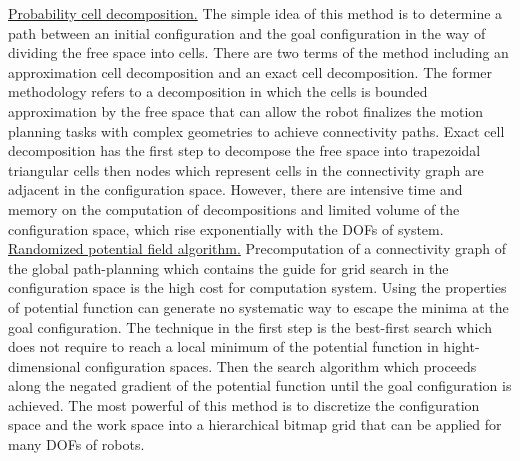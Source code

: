 \noindent\uline{Probability cell decomposition.} The simple idea of this method is to determine a path between an initial configuration and the goal configuration in the way of dividing the free space into cells. There are two terms of the method including an approximation cell decomposition and an exact cell decomposition\cite{Lingelbach04_PP_ProbabilisticCellDecomposition, Rosell05_PP_Harmonic_ProbabilisticCellDecomposition}. 
The former methodology refers to a decomposition in which the cells is bounded approximation by the free space that can allow the robot finalizes the motion planning tasks with complex geometries to achieve connectivity paths.
Exact cell decomposition has the first step to decompose the free space into trapezoidal triangular cells then nodes which represent cells in the connectivity graph are adjacent in the configuration space.
However, there are intensive time and memory on the computation of decompositions and limited volume of the configuration space, which rise exponentially with the DOFs of system.\\ 



\noindent\uline{Randomized potential field algorithm.} Precomputation of a connectivity graph of the global path-planning which contains the guide for grid search in the configuration space is the high cost for computation system. Using the properties of potential function \cite{Barraquand91_MP_DisctributedRepresenation}
can generate no systematic way to escape the minima at the goal configuration. The technique in the first step is the best-first search which does not require to reach a local minimum of the potential function in hight-dimensional configuration spaces. Then the search algorithm which proceeds along the negated gradient of the potential function until the goal configuration is achieved. The most powerful of this method is to discretize the configuration space and the work space into a hierarchical bitmap grid that can be applied for many DOFs of robots.\\

